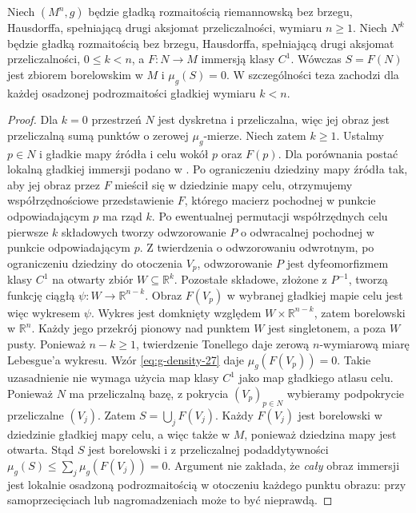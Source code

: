 \begin{wniosek}
\label{cor:submanifold-null-27}
Niech $(M^n,g)$ będzie gładką rozmaitością riemannowską
bez brzegu, Hausdorffa, spełniającą drugi aksjomat przeliczalności,
wymiaru $n\ge1$. Niech $N^k$ będzie gładką rozmaitością bez brzegu,
Hausdorffa, spełniającą drugi aksjomat przeliczalności, $0\le k<n$,
a $F:N\to M$ immersją klasy $C^1$. Wówczas $S=F(N)$
jest zbiorem borelowskim w $M$ i $\mu_g(S)=0$.
W szczególności teza zachodzi dla każdej osadzonej
podrozmaitości gładkiej wymiaru $k<n$.
\end{wniosek}
\begin{proof}
Dla $k=0$ przestrzeń $N$ jest dyskretna i przeliczalna,
więc jej obraz jest przeliczalną sumą punktów o zerowej
$\mu_g$-mierze. Niech zatem $k\ge1$.
Ustalmy $p\in N$ i gładkie mapy źródła i celu wokół $p$
oraz $F(p)$. Dla porównania postać lokalną gładkiej immersji podano w
.
Po ograniczeniu dziedziny mapy źródła tak, aby jej obraz
przez $F$ mieścił się w dziedzinie mapy celu, otrzymujemy
współrzędnościowe przedstawienie $F$, którego macierz
pochodnej w punkcie odpowiadającym $p$ ma rząd $k$. Po ewentualnej permutacji współrzędnych celu
pierwsze $k$ składowych tworzy odwzorowanie $P$ o odwracalnej
pochodnej w punkcie odpowiadającym $p$.
Z twierdzenia o odwzorowaniu odwrotnym, po ograniczeniu
dziedziny do otoczenia $V_p$, odwzorowanie $P$ jest
dyfeomorfizmem klasy $C^1$ na otwarty zbiór $W\subseteq\mathbb R^k$.
Pozostałe składowe, złożone z $P^{-1}$, tworzą funkcję
ciągłą $\psi:W\to\mathbb R^{n-k}$. Obraz $F(V_p)$
w wybranej gładkiej mapie celu jest więc wykresem $\psi$.
Wykres jest domknięty względem $W\times\mathbb R^{n-k}$,
zatem borelowski w $\mathbb R^n$. Każdy jego przekrój
pionowy nad punktem $W$ jest singletonem, a poza $W$ pusty.
Ponieważ $n-k\ge1$, twierdzenie Tonellego daje zerową
$n$-wymiarową miarę Lebesgue'a wykresu. Wzór
\eqref{eq:g-density-27} daje $\mu_g(F(V_p))=0$.
Takie uzasadnienie nie wymaga użycia map klasy $C^1$
jako map gładkiego atlasu celu.
Ponieważ $N$ ma przeliczalną bazę, z pokrycia
$(V_p)_{p\in N}$ wybieramy podpokrycie
przeliczalne $(V_j)$. Zatem
$S=\bigcup_jF(V_j)$. Każdy $F(V_j)$ jest borelowski
w dziedzinie gładkiej mapy celu, a więc także w $M$,
ponieważ dziedzina mapy jest otwarta. Stąd $S$ jest
borelowski i z przeliczalnej podaddytywności
$\mu_g(S)\le\sum_j\mu_g(F(V_j))=0$.
Argument nie zakłada, że \emph{cały} obraz immersji
jest lokalnie osadzoną podrozmaitością w otoczeniu
każdego punktu obrazu: przy samoprzecięciach lub
nagromadzeniach może to być nieprawdą.
\end{proof}

